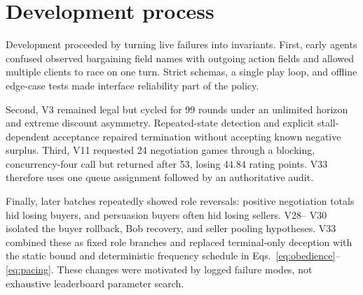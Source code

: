 \section{Development process}

Development proceeded by turning live failures into invariants. First, early
agents confused observed bargaining field names with outgoing action fields and
allowed multiple clients to race on one turn. Strict schemas, a single play
loop, and offline edge-case tests made interface reliability part of the policy.

Second, V3 remained legal but cycled for 99 rounds under an unlimited horizon
and extreme discount asymmetry. Repeated-state detection and explicit
stall-dependent acceptance repaired termination without accepting known
negative surplus. Third, V11 requested 24 negotiation games through a blocking,
concurrency-four call but returned after 53, losing 44.84 rating points. V33
therefore uses one queue assignment followed by an authoritative audit.

Finally, later batches repeatedly showed role reversals: positive negotiation
totals hid losing buyers, and persuasion buyers often hid losing sellers. V28--
V30 isolated the buyer rollback, Bob recovery, and seller pooling hypotheses.
V33 combined these as fixed role branches and replaced terminal-only deception
with the static bound and deterministic frequency schedule in
Eqs.~\ref{eq:obedience}--\ref{eq:pacing}. These changes were motivated by logged
failure modes, not exhaustive leaderboard parameter search.
